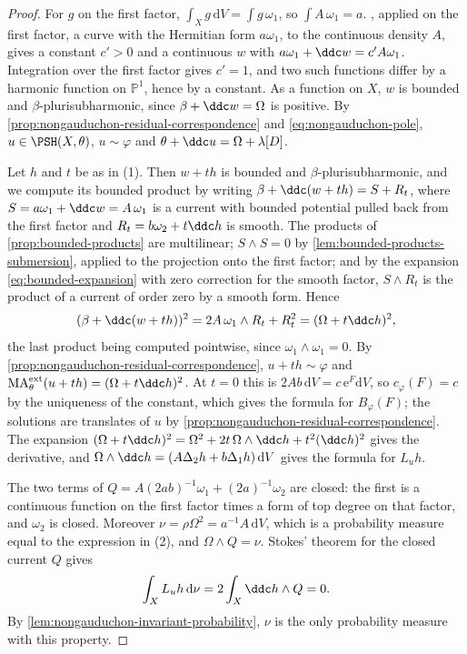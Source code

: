 \begin{proof}
For $g$ on the first factor, $\int_Xg\,\mathrm dV=\int g\,\omega_1$, so $\int A\,\omega_1=a$. , applied on the first factor, a curve with the Hermitian form $a\omega_1$, to the continuous density $A$, gives a constant $c'>0$ and a continuous $w$ with $a\omega_1+\ddc w=c'A\omega_1$. Integration over the first factor gives $c'=1$, and two such functions differ by a harmonic function on $\mathbb P^1$, hence by a constant. As a function on $X$, $w$ is bounded and $\beta$-plurisubharmonic, since $\beta+\ddc w=\Omega$ is positive. By \cref{prop:nongauduchon-residual-correspondence} and \eqref{eq:nongauduchon-pole}, $u\in\PSH(X,\theta)$, $u\sim\varphi$ and $\theta+\ddc u=\Omega+\lambda[D]$.

Let $h$ and $t$ be as in (1). Then $w+th$ is bounded and $\beta$-plurisubharmonic, and we compute its bounded product by writing $\beta+\ddc(w+th)=S+R_t$, where $S=a\omega_1+\ddc w=A\,\omega_1$ is a current with bounded potential pulled back from the first factor and $R_t=b\omega_2+t\ddc h$ is smooth. The products of \cref{prop:bounded-products} are multilinear; $S\wedge S=0$ by \cref{lem:bounded-products-submersion}, applied to the projection onto the first factor; and by the expansion \eqref{eq:bounded-expansion} with zero correction for the smooth factor, $S\wedge R_t$ is the product of a current of order zero by a smooth form. Hence
\[
 (\beta+\ddc(w+th))^2=2A\,\omega_1\wedge R_t+R_t^2=(\Omega+t\ddc h)^2,
\]
the last product being computed pointwise, since $\omega_1\wedge\omega_1=0$. By \cref{prop:nongauduchon-residual-correspondence}, $u+th\sim\varphi$ and $\mathrm{MA}^{\mathrm{ext}}_\theta(u+th)=(\Omega+t\ddc h)^2$. At $t=0$ this is $2Ab\,\mathrm dV=c\,\mathrm e^F\mathrm dV$, so $c_\varphi(F)=c$ by the uniqueness of the constant, which gives the formula for $B_\varphi(F)$; the solutions are translates of $u$ by \cref{prop:nongauduchon-residual-correspondence}. The expansion $(\Omega+t\ddc h)^2=\Omega^2+2t\,\Omega\wedge\ddc h+t^2(\ddc h)^2$ gives the derivative, and $\Omega\wedge\ddc h=(A\Delta_2h+b\Delta_1h)\,\mathrm dV$ gives the formula for $L_uh$.

The two terms of $Q=A(2ab)^{-1}\omega_1+(2a)^{-1}\omega_2$ are closed: the first is a continuous function on the first factor times a form of top degree on that factor, and $\omega_2$ is closed. Moreover $\nu=\rho\Omega^2=a^{-1}A\,\mathrm dV$, which is a probability measure equal to the expression in (2), and $\Omega\wedge Q=\nu$. Stokes' theorem for the closed current $Q$ gives
\[
 \int_XL_uh\,\mathrm d\nu=2\int_X\ddc h\wedge Q=0.
\]
By \cref{lem:nongauduchon-invariant-probability}, $\nu$ is the only probability measure with this property.


\end{proof}
